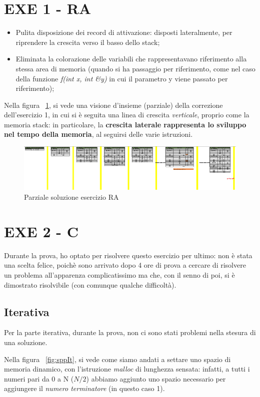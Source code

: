 \section{EXE 1 - RA}
\begin{itemize}
	\item Pulita disposizione dei record di attivazione: disposti lateralmente, per riprendere la crescita verso il basso dello stack;
	\item Eliminata la colorazione delle variabili che rappresentavano riferimento alla stessa area di memoria (quando si ha passaggio per riferimento, come nel caso della funzione \textit{f(int x, int \&y)} in cui il parametro y viene passato per riferimento);
\end{itemize}

Nella figura ~\ref{fig:ra}, si vede una visione d'insieme (parziale) della correzione dell'esercizio 1, in cui si è seguita una linea di crescita \textit{verticale}, proprio come la memoria stack: in particolare, la \textbf{crescita laterale rappresenta lo sviluppo nel tempo della memoria}, al seguirsi delle varie istruzioni.
\begin{figure}[h]
	\centering
	\includegraphics[width=1\textwidth]{Immagini/Partial_RA.png}
	\caption{Parziale soluzione esercizio RA}
	\label{fig:ra}
\end{figure}

\newpage
\section{EXE 2 - C}
Durante la prova, ho optato per risolvere questo esercizio per ultimo: non è stata una scelta felice, poichè sono arrivato dopo 4 ore di prova a cercare di risolvere un problema all'apparenza complicatissimo ma che, con il senno di poi, si è dimostrato risolvibile (con comunque qualche difficoltà).

\subsection{Iterativa}
Per la parte iterativa, durante la prova, non ci sono stati problemi nella stesura di una soluzione.

Nella figura ~\ref{fig:sppIt}, si vede come siamo andati a settare uno spazio di memoria dinamico, con l'istruzione \textit{malloc} di lunghezza sensata: infatti, a tutti i numeri pari da 0 a N ($N/2$) abbiamo aggiunto uno spazio necessario per aggiungere il \textit{numero terminatore} (in questo caso 1).

